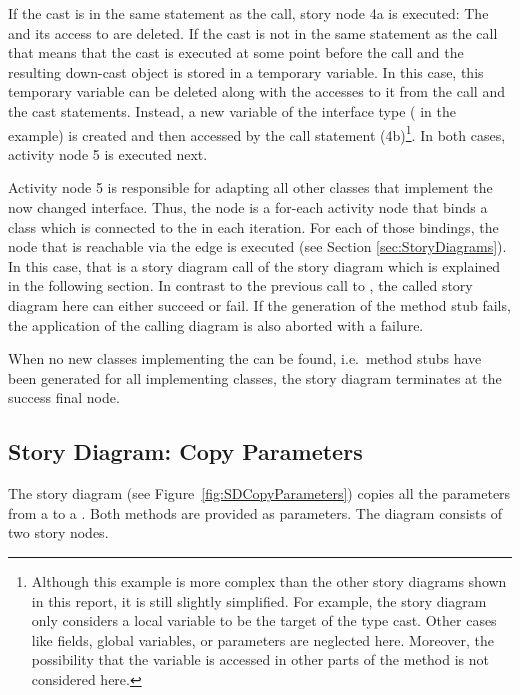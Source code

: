 If the cast is in the same statement as the call, story node 4a is executed: The  and its access to  are deleted. If the cast is not in the same statement as the call that means that the cast is executed at some point before the call and the resulting down-cast object is stored in a temporary variable. In this case, this temporary variable can be deleted along with the accesses to it from the call and the cast statements. Instead, a new variable of the interface type ( in the example) is created and then accessed by the call statement (4b)\footnote{Although this example is more complex than the other story diagrams shown in this report, it is still slightly simplified. For example, the story diagram only considers a local variable to be the target of the type cast. Other cases like fields, global variables, or parameters are neglected here. Moreover, the possibility that the variable is accessed in other parts of the method is not considered here.}. In both cases, activity node 5 is executed next.

Activity node 5 is responsible for adapting all other classes that implement the now changed interface. Thus, the node is a for-each activity node that binds a class which is connected to the  in each iteration. For each of those bindings, the node that is reachable via the  edge is executed (see Section \ref{sec:StoryDiagrams}). In this case, that is a story diagram call of the story diagram  which is explained in the following section. In contrast to the previous call to , the called story diagram here can either succeed or fail. If the generation of the method stub fails, the application of the calling diagram is also aborted with a failure.

When no new classes implementing the  can be found, i.e.\ method stubs have been generated for all implementing classes, the story diagram terminates at the success final node.


\subsection{Story Diagram: Copy Parameters} \label{sec:SDCopyParameters}

The story diagram  (see Figure~\ref{fig:SDCopyParameters}) copies all the parameters from a  to a . Both methods are provided as parameters. The diagram consists of two story nodes.

